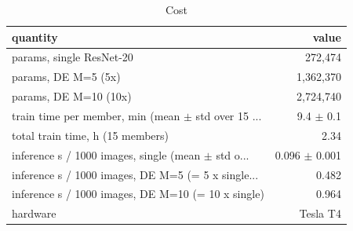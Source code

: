 \begin{table}
\centering
\caption{Cost}
\label{tab:de_cost}
\begin{tabular}{lr}
\toprule
                                          quantity &         value \\
\midrule
                          params, single ResNet-20 &       272,474 \\
                               params, DE M=5 (5x) &     1,362,370 \\
                             params, DE M=10 (10x) &     2,724,740 \\
train time per member, min (mean $\pm$ std over 15 ... &     9.4 $\pm$ 0.1 \\
                  total train time, h (15 members) &          2.34 \\
inference s / 1000 images, single (mean $\pm$ std o... & 0.096 $\pm$ 0.001 \\
inference s / 1000 images, DE M=5 (= 5 x single... &         0.482 \\
inference s / 1000 images, DE M=10 (= 10 x single) &         0.964 \\
                                          hardware &      Tesla T4 \\
\bottomrule
\end{tabular}
\end{table}
